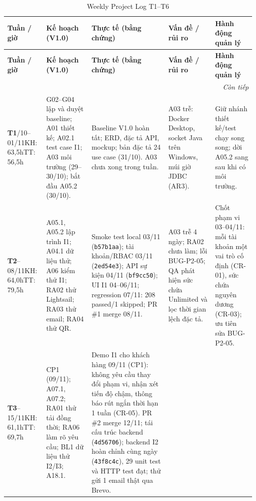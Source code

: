 \begingroup\footnotesize
\renewcommand{\arraystretch}{1.18}
\begin{longtable}{@{}p{.11\linewidth}p{.20\linewidth}p{.25\linewidth}p{.19\linewidth}p{.19\linewidth}@{}}
\caption{Weekly Project Log T1--T6}\label{tab:t3-weekly}\\
\toprule
\textbf{Tuần / giờ} & \textbf{Kế hoạch (V1.0)} & \textbf{Thực tế (bằng chứng)} & \textbf{Vấn đề / rủi ro} & \textbf{Hành động quản lý}\\\midrule\endfirsthead
\toprule
\textbf{Tuần / giờ} & \textbf{Kế hoạch (V1.0)} & \textbf{Thực tế (bằng chứng)} & \textbf{Vấn đề / rủi ro} & \textbf{Hành động quản lý}\\\midrule\endhead
\midrule\multicolumn{5}{r}{\textit{Còn tiếp}}\\\endfoot
\bottomrule\endlastfoot
\textbf{T1}\newline 26/10--01/11\newline KH: 63,5h\newline TT: 56,5h &
G02--G04 lập và duyệt baseline; A01 thiết kế; A02.1 test case I1; A03 môi trường (29--30/10); bắt đầu A05.2 (30/10). &
Baseline V1.0 hoàn tất; ERD, đặc tả API, mockup; bản đặc tả 24 use case (31/10). A03 chưa xong trong tuần. &
A03 trễ: Docker Desktop, socket Java trên Windows, múi giờ JDBC (AR3). &
Giữ nhánh thiết kế/test chạy song song; dời A05.2 sang sau khi có môi trường.\\
\textbf{T2}\newline 02--08/11\newline KH: 64,0h\newline TT: 79,5h &
A05.1, A05.2 lập trình I1; A04.1 dữ liệu thử; A06 kiểm thử I1; RA02 thử Lightsail; RA03 thử email; RA04 thử QR. &
Smoke test local 03/11 (\texttt{b57b1aa}); tài khoản/RBAC 03/11 (\texttt{2ed54e3}); API sự kiện 04/11 (\texttt{bf9cc50}); UI I1 04--06/11; regression 07/11: 208 passed/1 skipped; PR \#1 merge 08/11. &
A03 trễ 4 ngày; RA02 chưa làm; lỗi BUG-P2-05; QA phát hiện sức chứa Unlimited và lọc thời gian lệch đặc tả. &
Chốt phạm vi 03--04/11: mỗi tài khoản một vai trò cố định (CR-01), sức chứa nguyên dương (CR-03); ưu tiên sửa BUG-P2-05.\\
\textbf{T3}\newline 09--15/11\newline KH: 61,1h\newline TT: 69,7h &
CP1 (09/11); A07.1, A07.2; RA01 thử tải đồng thời; RA06 làm rõ yêu cầu; BL1 dữ liệu thử I2/I3; A18.1. &
Demo I1 cho khách hàng 09/11 (CP1): không yêu cầu thay đổi phạm vi, nhận xét tiến độ chậm, thông báo rút ngắn thời hạn 1 tuần (CR-05). PR \#2 merge 12/11; tái cấu trúc backend (\texttt{4d56706}); backend I2 hoàn chỉnh cùng ngày (\texttt{43f8c4c}), 29 unit test và HTTP test đạt; thử gửi 1 email thật qua Brevo. &

\end{longtable}
